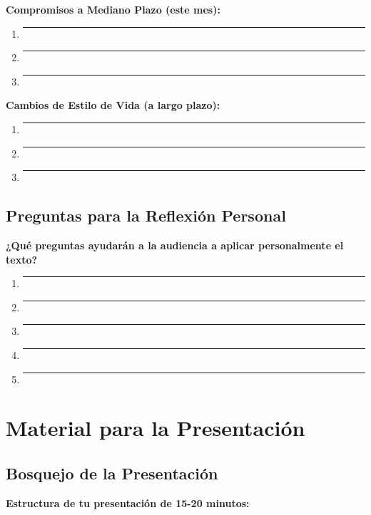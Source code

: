 \documentclass[11pt,a4paper]{article}
\begin{document}
\textbf{Compromisos a Mediano Plazo (este mes):}
\begin{enumerate}[leftmargin=1cm]
    \item \rule{12cm}{0.4pt}
    \item \rule{12cm}{0.4pt}
    \item \rule{12cm}{0.4pt}
\end{enumerate}

\textbf{Cambios de Estilo de Vida (a largo plazo):}
\begin{enumerate}[leftmargin=1cm]
    \item \rule{12cm}{0.4pt}
    \item \rule{12cm}{0.4pt}
    \item \rule{12cm}{0.4pt}
\end{enumerate}

\subsection{Preguntas para la Reflexión Personal}

\textbf{¿Qué preguntas ayudarán a la audiencia a aplicar personalmente el texto?}

\begin{enumerate}[leftmargin=1cm]
    \item \rule{12cm}{0.4pt}
    \vspace{0.5cm}
    \item \rule{12cm}{0.4pt}
    \vspace{0.5cm}
    \item \rule{12cm}{0.4pt}
    \vspace{0.5cm}
    \item \rule{12cm}{0.4pt}
    \vspace{0.5cm}
    \item \rule{12cm}{0.4pt}
    \vspace{0.5cm}
\end{enumerate}

\section{Material para la Presentación}

\subsection{Bosquejo de la Presentación}

\textbf{Estructura de tu presentación de 15-20 minutos:}
\end{document}
